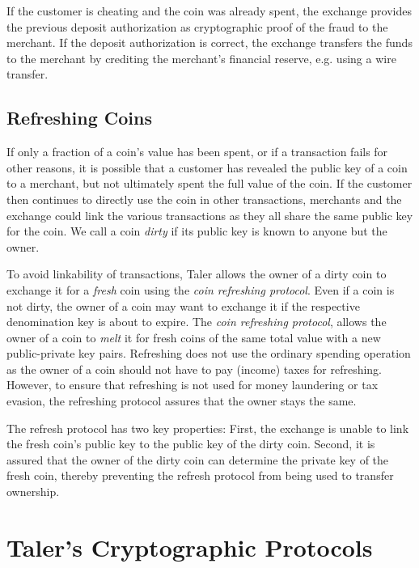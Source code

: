 \documentclass{llncs}
\begin{document}
If the customer is cheating and the coin was already spent, the
exchange provides the previous deposit authorization as cryptographic
proof of the fraud to the merchant.  If the deposit authorization is
correct, the exchange transfers the funds to the merchant by crediting
the merchant's financial reserve, e.g. using a wire transfer.


\subsection{Refreshing Coins}

If only a fraction of a coin's value has been spent, or if a
transaction fails for other reasons, it is possible that a customer
has revealed the public key of a coin to a merchant, but not
ultimately spent the full value of the coin.  If the customer then
continues to directly use the coin in other transactions, merchants
and the exchange could link the various transactions as they all share
the same public key for the coin.  We call a coin {\em dirty} if its
public key is known to anyone but the owner.

To avoid linkability of transactions, Taler allows the owner of a
dirty coin to exchange it for a {\em fresh} coin using the {\em coin
  refreshing protocol}.  Even if a coin is not dirty, the owner of a
coin may want to exchange it if the respective denomination key is
about to expire.  The {\em coin refreshing protocol}, allows the owner
of a coin to {\em melt} it for fresh coins of the same total value with a
new public-private key pairs.  Refreshing does not use the ordinary
spending operation as the owner of a coin should not have to pay
(income) taxes for refreshing.  However, to ensure that refreshing is
not used for money laundering or tax evasion, the refreshing protocol
assures that the owner stays the same.

The refresh protocol has two key properties: First, the exchange is
unable to link the fresh coin's public key to the public key of the
dirty coin.  Second, it is assured that the owner of the dirty coin
can determine the private key of the fresh coin, thereby preventing
the refresh protocol from being used to transfer ownership.


\section{Taler's Cryptographic Protocols}

\def\KDF{\textrm{KDF}}
\def\FDH{\textrm{FDH}}
\end{document}
